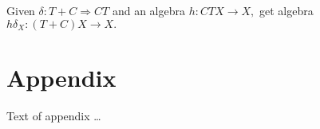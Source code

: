 \documentclass[sigplan,9pt,review,anonymous]{acmart}\settopmatter{printfolios=true,printccs=false,printacmref=false}
\newcommand{\maps}{\colon}
\begin{document}
Given $\delta\maps T+C \Rightarrow CT$ and an algebra $h\maps CTX \to X,$ get algebra $h\delta_X\maps (T+C)X \to X.$




\begin{acks}                            %
\end{acks}


%


\appendix
\section{Appendix}

Text of appendix \ldots
\end{document}
